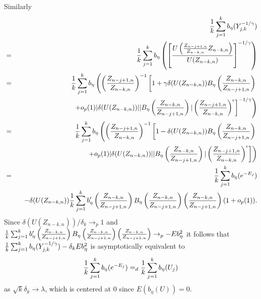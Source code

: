 \begin{subappendices}
Similarly 
\begin{eqnarray*}
&&{1 \over k}\sum_{j=1}^k b_\eta (Y_{j,k}^{-1/\gamma})\\&=&
{1 \over k}\sum_{j=1}^k b_\eta \left(\left[ {U \left({Z_{n-j+1,n}\over Z_{n-k,n}} Z_{n-k,n} \right)\over U(Z_{n-k,n}) }\right]^{-1/\gamma} \right)\\
&=& {1 \over k}\sum_{j=1}^k b_\eta
\left(
\left({Z_{n-j+1,n}\over Z_{n-k,n}}\right)^{-1}
\left[
1+\gamma \delta (U(Z_{n-k,n}))B_\eta \left( {Z_{n-k,n} \over Z_{n-j+1,n}}\right) \right. \right. \\
&& \hspace{2.5cm}\left.\left.
+o_p(1)|\delta (U(Z_{n-k,n}))| |B_\eta \left( {Z_{n-k,n} \over Z_{n-j+1,n}}\right)| \left({Z_{n-j+1,n}\over Z_{n-k,n}}\right)^\epsilon 
\right]^{-1/\gamma}
\right)\\
&=&{1 \over k}\sum_{j=1}^k b_\eta
\left(
\left({Z_{n-j+1,n}\over Z_{n-k,n}}\right)^{-1}
\left[
1-\delta (U(Z_{n-k,n}))B_\eta \left( {Z_{n-k,n} \over Z_{n-j+1,n}}\right) \right. \right. \\
&& \hspace{2.5cm}\left.\left.
+o_p(1)|\delta (U(Z_{n-k,n}))| |B_\eta \left( {Z_{n-k,n} \over Z_{n-j+1,n}}\right)| \left({Z_{n-j+1,n}\over Z_{n-k,n}}\right)^\epsilon 
\right]
\right)
\\
&=& {1 \over k}\sum_{j=1}^k b_\eta (e^{-E_j})\\
&& \hspace{0.3cm}
-\delta (U(Z_{n-k,n})){1 \over k}\sum_{j=1}^k 
b'_\eta \left( {Z_{n-k,n} \over Z_{n-j+1,n}}\right)
B_\eta \left( {Z_{n-k,n} \over Z_{n-j+1,n}}\right) \left( {Z_{n-k,n} \over Z_{n-j+1,n}}\right)(1+o_p(1)).
\end{eqnarray*}
Since $\delta (U(Z_{n-k,n}))/\delta_k \to_p 1$
and ${1 \over k}\sum_{j=1}^k 
b'_\eta \left( {Z_{n-k,n} \over Z_{n-j+1,n}}\right)
B_\eta \left( {Z_{n-k,n} \over Z_{n-j+1,n}}\right) \left( {Z_{n-k,n} \over Z_{n-j+1,n}}\right) \to_p - Eb^2_\eta$
it follows that 
$
{1 \over k}\sum_{j=1}^k b_\eta (Y_{j,k}^{-1/\gamma})
- \delta_k E b^2_{\eta}$
is asymptotically equivalent to $${1 \over k}\sum_{j=1}^k b_\eta (e^{-E_j})=_d {1 \over k}\sum_{j=1}^k b_\eta (U_j)$$ as $\sqrt{k} \delta_k \to \lambda$, which is centered at 0 since $E(b_\eta (U))=0$.


\end{subappendices}
